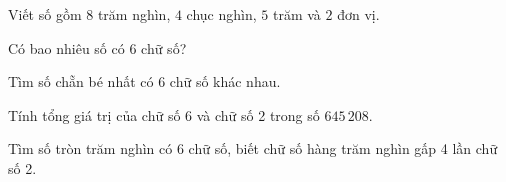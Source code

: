 \begin{ex} %
Viết số gồm $8$ trăm nghìn, $4$ chục nghìn, $5$ trăm và $2$ đơn vị.
\end{ex}

\begin{ex} %
Có bao nhiêu số có 6 chữ số?
\end{ex}

\begin{ex} %
Tìm số chẵn bé nhất có 6 chữ số khác nhau.
\end{ex}

\begin{ex} %
Tính tổng giá trị của chữ số 6 và chữ số 2 trong số $645\,208$.
\end{ex}

\begin{ex} %
Tìm số tròn trăm nghìn có 6 chữ số, biết chữ số hàng trăm nghìn gấp 4 lần chữ số 2.
\end{ex}
